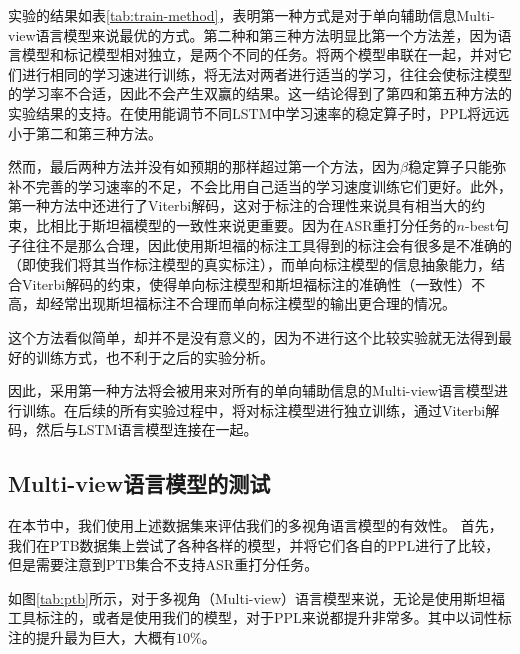 实验的结果如表\ref{tab:train-method}，表明第一种方式是对于单向辅助信息Multi-view语言模型来说最优的方式。第二种和第三种方法明显比第一个方法差，因为语言模型和标记模型相对独立，是两个不同的任务。将两个模型串联在一起，并对它们进行相同的学习速进行训练，将无法对两者进行适当的学习，往往会使标注模型的学习率不合适，因此不会产生双赢的结果。这一结论得到了第四和第五种方法的实验结果的支持。在使用能调节不同LSTM中学习速率的稳定算子时，PPL将远远小于第二和第三种方法。

然而，最后两种方法并没有如预期的那样超过第一个方法，因为$\beta$稳定算子只能弥补不完善的学习速率的不足，不会比用自己适当的学习速度训练它们更好。此外，第一种方法中还进行了Viterbi解码，这对于标注的合理性来说具有相当大的约束，比相比于斯坦福模型的一致性来说更重要。因为在ASR重打分任务的$n$-best句子往往不是那么合理，因此使用斯坦福的标注工具得到的标注会有很多是不准确的（即使我们将其当作标注模型的真实标注），而单向标注模型的信息抽象能力，结合Viterbi解码的约束，使得单向标注模型和斯坦福标注的准确性（一致性）不高，却经常出现斯坦福标注不合理而单向标注模型的输出更合理的情况。

这个方法看似简单，却并不是没有意义的，因为不进行这个比较实验就无法得到最好的训练方式，也不利于之后的实验分析。

因此，采用第一种方法将会被用来对所有的单向辅助信息的Multi-view语言模型进行训练。在后续的所有实验过程中，将对标注模型进行独立训练，通过Viterbi解码，然后与LSTM语言模型连接在一起。


\subsection{Multi-view语言模型的测试}

在本节中，我们使用上述数据集来评估我们的多视角语言模型的有效性。
首先，我们在PTB数据集上尝试了各种各样的模型，并将它们各自的PPL进行了比较，但是需要注意到PTB集合不支持ASR重打分任务。


如图\ref{tab:ptb}所示，对于多视角（Multi-view）语言模型来说，无论是使用斯坦福工具标注的，或者是使用我们的模型，对于PPL来说都提升非常多。其中以词性标注的提升最为巨大，大概有$10\%$。


